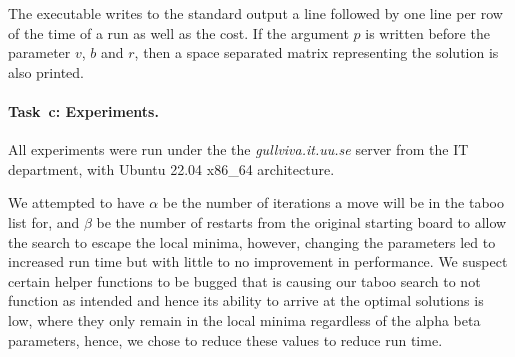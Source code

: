 The executable writes to the standard output a line  followed by one line per row of the time of a run as well as the cost. If the argument $p$ is written before the parameter $v$, $b$ and $r$, then a space separated matrix representing the solution is also printed. 


\paragraph{Task~c: Experiments.}
All experiments were run under the the \textit{gullviva.it.uu.se} server from the IT department, with Ubuntu 22.04 x86\_64 architecture. 

We attempted to have $\alpha$ be the number of iterations a move will be in the taboo list for, and $\beta$ be the number of restarts from the original starting board to allow the search to escape the local minima, however, changing the parameters led to increased run time but with little to no improvement in performance. We suspect certain helper functions to be bugged that is causing our taboo search to not function as intended and hence its ability to arrive at the optimal solutions is low, where they only remain in the local minima regardless of the alpha beta parameters, hence, we chose to reduce these values to reduce run time.
%
\newcommand{\TimeoutSLS}{\todo{300.0}}  %
\newcommand{\RunsSLS}{\todo{5}}         %
%
%

